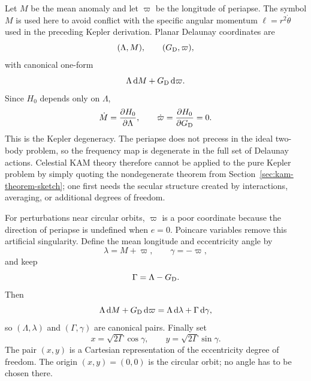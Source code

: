 Let \(M\) be the mean anomaly and let \(\varpi\) be the longitude of
periapse.  The symbol \(M\) is used here to avoid conflict with the specific
angular momentum \(\ell=r^2\dot\theta\) used in the preceding Kepler
derivation.  Planar Delaunay coordinates are
\[
  (\Lambda,M),\qquad (G_{\rm D},\varpi),
\]
with canonical one-form
\[
  \Lambda\,\mathrm{d} M+G_{\rm D}\,\mathrm{d}\varpi .
\]
Since \(H_0\) depends only on \(\Lambda\),
\[
  \dot M=\frac{\partial H_0}{\partial \Lambda},
  \qquad
  \dot\varpi=\frac{\partial H_0}{\partial G_{\rm D}}=0.
\]
This is the Kepler degeneracy.  The periapse does not precess in the ideal
two-body problem, so the frequency map is degenerate in the full set of
Delaunay actions.  Celestial KAM theory therefore cannot be applied to the pure
Kepler problem by simply quoting the nondegenerate theorem from
Section~\ref{sec:kam-theorem-sketch}; one first needs the secular structure
created by interactions, averaging, or additional degrees of freedom.

For perturbations near circular orbits, \(\varpi\) is a poor coordinate because
the direction of periapse is undefined when \(e=0\).  Poincare variables remove
this artificial singularity.  Define the mean longitude and eccentricity angle
by
\[
  \lambda=M+\varpi,\qquad \gamma=-\varpi,
\]
and keep
\[
  \Gamma=\Lambda-G_{\rm D}.
\]
Then
\[
  \Lambda\,\mathrm{d} M+G_{\rm D}\,\mathrm{d}\varpi
  =
  \Lambda\,\mathrm{d}\lambda+\Gamma\,\mathrm{d}\gamma,
\]
so \((\Lambda,\lambda)\) and \((\Gamma,\gamma)\) are canonical pairs.  Finally
set
\[
  x=\sqrt{2\Gamma}\cos\gamma,\qquad
  y=\sqrt{2\Gamma}\sin\gamma.
\]
The pair \((x,y)\) is a Cartesian representation of the eccentricity degree of
freedom.  The origin \((x,y)=(0,0)\) is the circular orbit; no angle has to be
chosen there.

